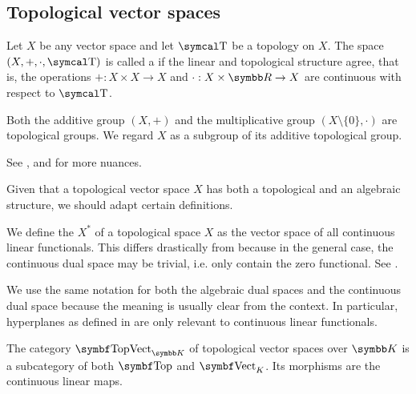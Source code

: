 \subsection{Topological vector spaces}\label{subsec:topological_vector_spaces}

\begin{definition}\label{def:topological_vector_space}
  Let \( X \) be any vector space and let \( \CT \) be a topology on \( X \). The space \( (X, +, \cdot, \CT) \) is called a  if the linear and topological structure agree, that is, the operations \( +: X \times X \to X \) and \( \cdot: X \times \BR \to X \) are continuous with respect to \( \CT \).

  Both the additive group \( (X, +) \) and the multiplicative group \( (X \setminus \{ 0 \}, \cdot) \) are topological groups. We regard \( X \) as a subgroup of its additive topological group.

  See ,  and  for more nuances.
\end{definition}

Given that a topological vector space \( X \) has both a topological and an algebraic structure, we should adapt certain definitions.

\begin{definition}\label{def:continuous_dual_space}
  We define the  \( X^* \) of a topological space \( X \) as the vector space of all continuous linear functionals. This differs drastically from  because in the general case, the continuous dual space may be trivial, i.e. only contain the zero functional. See .

  We use the same notation for both the algebraic dual spaces and the continuous dual space because the meaning is usually clear from the context. In particular, hyperplanes as defined in  are only relevant to continuous linear functionals.
\end{definition}

\begin{definition}\label{def:category_of_topological_vector_spaces}
  The category \( \Cat{TopVect}_{\BK} \) of topological vector spaces over \( \BK \) is a subcategory of both \( \Cat{Top} \) and \( \Cat{Vect}_K \). Its morphisms are the continuous linear maps.
\end{definition}

